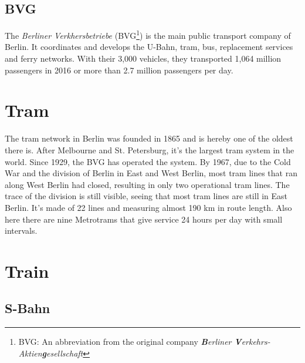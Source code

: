 \subsection*{BVG}
The \textit{Berliner Verkhersbetriebe} (BVG\footnote{BVG: An abbreviation from the original company \textit{\textbf{B}erliner \textbf{V}erkehrs-Aktien\textbf{g}esellschaft}}) is the main public transport company of Berlin. It coordinates and develops the U-Bahn, tram, bus, replacement services and ferry networks\cite{BVG1}. With their 3,000 vehicles, they transported 1,064 million passengers in 2016 or more than 2.7 million passengers per day\cite{MobilityCity}.


\section{Tram}
 The tram network in Berlin was founded in 1865 and is hereby one of the oldest there is. After Melbourne and St. Petersburg, it's the largest tram system in the world. Since 1929, the BVG has operated the system\cite{tram}. By 1967, due to the Cold War and the division of Berlin in East and West Berlin, most tram lines that ran along West Berlin had closed, resulting in only two operational tram lines. The trace of the division is still visible, seeing that most tram lines are still in East Berlin\cite{tramz}. It's made of 22 lines and measuring almost 190 km in route length. Also here there are nine Metrotrams that give service 24 hours per day with small intervals\cite{tram}. 
 
\section{Train}
\subsection{S-Bahn} \label{sebsec:sBahn}

